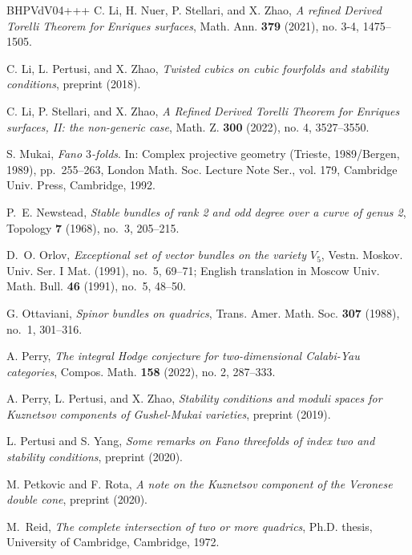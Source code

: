 \documentclass[11pt]{amsart}
\theoremstyle{definition}
\begin{document}
\begin{thebibliography}{BHPVdV04+++}
C. Li, H. Nuer, P. Stellari, and X. Zhao, \emph{A
  refined Derived Torelli Theorem for Enriques surfaces}, 
  Math. Ann. \textbf{379} (2021),  no. 3-4, 1475--1505.

C. Li, L. Pertusi, and X. Zhao, \emph{Twisted cubics on
  cubic fourfolds and stability conditions}, preprint  (2018).

C. Li, P. Stellari, and X. Zhao, \emph{A Refined Derived
  Torelli Theorem for Enriques surfaces, II: the non-generic case}, Math. Z. \textbf{300} (2022), no. 4, 3527--3550. 

S. Mukai, \emph{Fano {$3$}-folds}. In: Complex projective geometry ({T}rieste,
  1989/{B}ergen, 1989), pp.~255--263, London Math. Soc. Lecture Note Ser., vol. 179,
  Cambridge Univ. Press, Cambridge, 1992.

P.~E. Newstead, \emph{Stable bundles of rank 2 and odd degree over a curve
  of genus 2}, Topology \textbf{7} (1968), no.~3, 205--215.

D.~O. Orlov, \emph{Exceptional set of vector bundles on the variety $V_5$}, Vestn. Moskov. Univ. Ser. I Mat. (1991), no.~5, 69--71; English translation in
Moscow Univ. Math. Bull. \textbf{46} (1991), no.~5, 48--50.

G. Ottaviani, \emph{Spinor bundles on quadrics}, Trans. Amer. Math. Soc. \textbf{307} (1988), no.~1, 301--316.

A. Perry, \emph{The integral Hodge conjecture for two-dimensional
  Calabi-Yau categories}, Compos. Math. \textbf{158} (2022), no. 2, 287--333. 

A. Perry, L. Pertusi, and X. Zhao, \emph{Stability
  conditions and moduli spaces for Kuznetsov components of Gushel-Mukai
  varieties}, preprint  (2019).
  
L. Pertusi and S. Yang, \emph{Some remarks on Fano threefolds of
  index two and stability conditions}, preprint  (2020).

M. Petkovic and F. Rota, \emph{A note on the Kuznetsov component of
  the Veronese double cone}, preprint  (2020).

M.~Reid, \emph{The complete intersection of two or more quadrics}, Ph.D.
  thesis, University of Cambridge, Cambridge, 1972.


\end{thebibliography}
\end{document}
